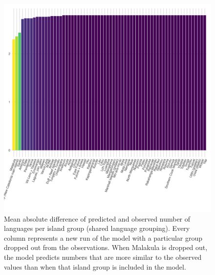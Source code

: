 \documentclass[a4paper,10pt]{article} %
\begin{document}
\begin{figure}[ht]
\includegraphics[width=15cm]{brms_medium_dropped_out_plot_diff.png}
\caption{Mean absolute difference of predicted and observed number of languages per island group (shared language grouping). Every column represents a new run of the model with a particular group dropped out from the observations. When Malakula is dropped out, the model predicts numbers that are more similar to the observed values than when that island group is included in the model.}
\label{brms_medium_dropped_out_plot_diff}
\end{figure}
\end{document}
